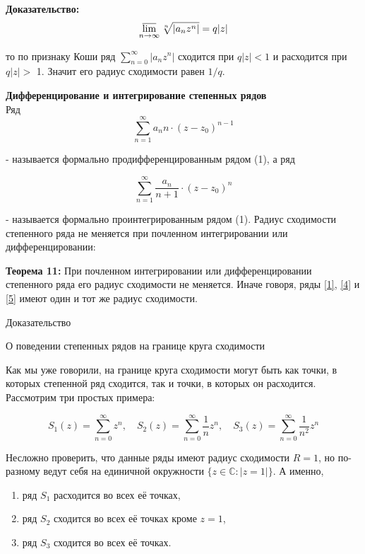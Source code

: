 \documentclass[a4paper,12pt]{article} %
\begin{document}
\textbf{Доказательство:}\\
$$
\varlimsup_{n \rightarrow \infty} \sqrt[n]{\left|a_{n} z^{n}\right|}=q|z|
$$

то по признаку Коши ряд $\sum_{n=0}^{\infty}\left|a_{n} z^{n}\right|$ сходится при $q|z|<1$ и расходится при $q|z|>$ 1. Значит его радиус сходимости равен $1 / q$.

\textbf{Дифференцирование и интегрирование степенных рядов}\\
Ряд
\begin{equation}\label{4}
\sum_{n=1}^{\infty} a_{n} n \cdot\left(z-z_{0}\right)^{n-1}
\end{equation}

- называется формально продифференцированным рядом (1), а ряд

\begin{equation}\label{5}
\sum_{n=1}^{\infty} \frac{a_{n}}{n+1} \cdot\left(z-z_{0}\right)^{n}
\end{equation}

- называется формально проинтегрированным рядом (1).
Радиус сходимости степенного ряда не меняется при почленном интегрировании или дифференцировании:

\textbf{Теорема 11:} При почленном интегрировании или дифференцировании степенного ряда его радиус сходимости не меняется. Иначе говоря, ряды \eqref{1}, \eqref{4} и \eqref{5} имеют один и тот же радиус сходимости.

Доказательство

О поведении степенных рядов на границе круга сходимости

Как мы уже говорили, на границе круга сходимости могут быть как точки, в которых степенной ряд сходится, так и точки, в которых он расходится. Рассмотрим три простых примера:

$$
S_{1}(z)=\sum_{n=0}^{\infty} z^{n}, \quad S_{2}(z)=\sum_{n=0}^{\infty} \frac{1}{n} z^{n}, \quad S_{3}(z)=\sum_{n=0}^{\infty} \frac{1}{n^{2}} z^{n}
$$

Несложно проверить, что данные ряды имеют радиус сходимости $R=1$, но по-разному ведут себя на единичной окружности $\{z \in \mathbb{C}:|z=1|\}$. А именно,

\begin{enumerate}
\item ряд $S_{1}$ расходится во всех её точках,
\item ряд $S_{2}$ сходится во всех её точках кроме $z=1$,

\item ряд $S_{3}$ сходится во всех её точках.

\end{enumerate}
\end{document}
